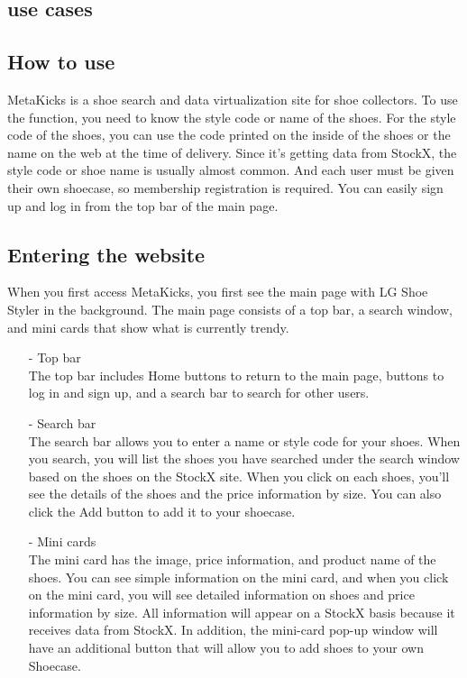 \documentclass[conference]{IEEEtran}
\begin{document}
\begin{enumerate}
\section{use cases}
\subsection{How to use}
MetaKicks is a shoe search and data virtualization site for shoe collectors. To use the function, you need to know the style code or name of the shoes. For the style code of the shoes, you can use the code printed on the inside of the shoes or the name on the web at the time of delivery. Since it's getting data from StockX, the style code or shoe name is usually almost common. And each user must be given their own shoecase, so membership registration is required. You can easily sign up and log in from the top bar of the main page.\\
\subsection{Entering the website}
When you first access MetaKicks, you first see the main page with LG Shoe Styler in the background. The main page consists of a top bar, a search window, and mini cards that show what is currently trendy.\\
\begin{enumerate}
\item[-]Top bar\\
The top bar includes  Home buttons to return to the main page, buttons to log in and sign up, and a search bar to search for other users.\\
\item[-]Search bar\\
The search bar allows you to enter a name or style code for your shoes. When you search, you will list the shoes you have searched under the search window based on the shoes on the StockX site. When you click on each shoes, you'll see the details of the shoes and the price information by size. You can also click the Add button to add it to your shoecase.\\
\item[-]Mini cards\\
The mini card has the image, price information, and product name of the shoes. You can see simple information on the mini card, and when you click on the mini card, you will see detailed information on shoes and price information by size. All information will appear on a StockX basis because it receives data from StockX. In addition, the mini-card pop-up window will have an additional button that will allow you to add shoes to your own Shoecase.\\
\end{enumerate}


\end{enumerate}
\end{document}
